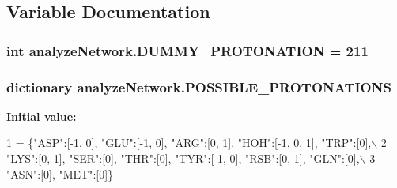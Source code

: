 \subsection{Variable Documentation}
\hypertarget{namespaceanalyze_network_a9522a4ca48f20aa3cc2230c0d094f49f}{
\subsubsection[{D\-U\-M\-M\-Y\-\_\-\-P\-R\-O\-T\-O\-N\-A\-T\-I\-O\-N}]{\setlength{\rightskip}{0pt plus 5cm}int analyze\-Network.\-D\-U\-M\-M\-Y\-\_\-\-P\-R\-O\-T\-O\-N\-A\-T\-I\-O\-N = 211}}\label{namespaceanalyze_network_a9522a4ca48f20aa3cc2230c0d094f49f}
\hypertarget{namespaceanalyze_network_a4af941f8433e14aa7d958e74cc6272b8}{
\subsubsection[{P\-O\-S\-S\-I\-B\-L\-E\-\_\-\-P\-R\-O\-T\-O\-N\-A\-T\-I\-O\-N\-S}]{\setlength{\rightskip}{0pt plus 5cm}dictionary analyze\-Network.\-P\-O\-S\-S\-I\-B\-L\-E\-\_\-\-P\-R\-O\-T\-O\-N\-A\-T\-I\-O\-N\-S}}\label{namespaceanalyze_network_a4af941f8433e14aa7d958e74cc6272b8}
{\bfseries Initial value\-:}
\begin{DoxyCode}
1 = \{\textcolor{stringliteral}{"ASP"}:[-1, 0], \textcolor{stringliteral}{"GLU"}:[-1, 0], \textcolor{stringliteral}{"ARG"}:[0, 1], \textcolor{stringliteral}{"HOH"}:[-1, 0, 1], \textcolor{stringliteral}{"TRP"}:[0],\(\backslash\)
2                          \textcolor{stringliteral}{"LYS"}:[0, 1], \textcolor{stringliteral}{"SER"}:[0], \textcolor{stringliteral}{"THR"}:[0], \textcolor{stringliteral}{"TYR"}:[-1, 0], \textcolor{stringliteral}{"RSB"}:[0, 1], \textcolor{stringliteral}{"GLN"}:[0],\(\backslash\)
3                          \textcolor{stringliteral}{"ASN"}:[0], \textcolor{stringliteral}{"MET"}:[0]\}
\end{DoxyCode}
